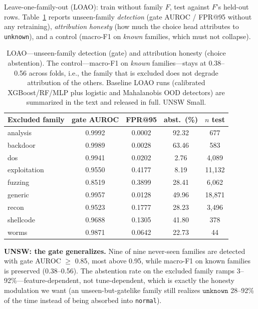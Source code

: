 \documentclass[sigconf,anonymous=false]{acmart}
\begin{document}
Leave-one-family-out (LOAO): train without family $F$, test against $F$'s held-out rows. Table~\ref{tab:e2} reports unseen-family \emph{detection} (gate AUROC / FPR@95 without any retraining), \emph{attribution honesty} (how much the choice head attributes to \texttt{unknown}), and a control (macro-F1 on \emph{known} families, which must not collapse).

\begin{table}[t]
\caption{LOAO---unseen-family detection (gate) and attribution honesty (choice abstention). The control---macro-F1 on \emph{known} families---stays at 0.38--0.56 across folds, i.e., the family that is excluded does not degrade attribution of the others. Baseline LOAO runs (calibrated XGBoost/RF/MLP plus logistic and Mahalanobis OOD detectors) are summarized in the text and released in full. UNSW Small.}
\label{tab:e2}
\small
\setlength{\tabcolsep}{4pt}
\begin{tabular}{lcccc}
\toprule
Excluded family & gate AUROC & FPR@95 & abst.\ (\%) & $n$ test \\
\midrule
analysis        & 0.9992 & 0.0002 & 92.32 & 677 \\
backdoor        & 0.9989 & 0.0028 & 63.46 & 583 \\
dos             & 0.9941 & 0.0202 & 2.76  & 4{,}089 \\
exploitation    & 0.9550 & 0.4177 & 8.19  & 11{,}132 \\
fuzzing         & 0.8519 & 0.3899 & 28.41 & 6{,}062 \\
generic         & 0.9957 & 0.0128 & 49.96 & 18{,}871 \\
recon           & 0.9523 & 0.1777 & 28.23 & 3{,}496 \\
shellcode       & 0.9688 & 0.1305 & 41.80 & 378 \\
worms           & 0.9871 & 0.0642 & 22.73 & 44 \\
\bottomrule
\end{tabular}
\end{table}

\textbf{UNSW: the gate generalizes.} Nine of nine never-seen families are detected with gate AUROC $\ge$ 0.85, most above 0.95, while macro-F1 on known families is preserved (0.38--0.56). The abstention rate on the excluded family ramps 3--92\%---feature-dependent, not tune-dependent, which is exactly the honesty modulation we want (an unseen-but-gatelike family still realizes $\texttt{unknown}$ 28--92\% of the time instead of being absorbed into \texttt{normal}).
\end{document}
